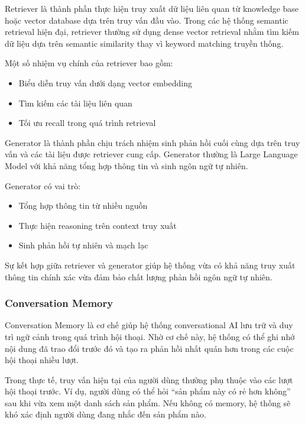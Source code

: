Retriever là thành phần thực hiện truy xuất dữ liệu liên quan từ knowledge base hoặc vector database dựa trên truy vấn đầu vào. Trong các hệ thống semantic retrieval hiện đại, retriever thường sử dụng dense vector retrieval nhằm tìm kiếm dữ liệu dựa trên semantic similarity thay vì keyword matching truyền thống.

Một số nhiệm vụ chính của retriever bao gồm:
\begin{itemize}
    \item Biểu diễn truy vấn dưới dạng vector embedding
    
    \item Tìm kiếm các tài liệu liên quan
    
    \item Tối ưu recall trong quá trình retrieval
\end{itemize}

Generator là thành phần chịu trách nhiệm sinh phản hồi cuối cùng dựa trên truy vấn và các tài liệu được retriever cung cấp. Generator thường là Large Language Model với khả năng tổng hợp thông tin và sinh ngôn ngữ tự nhiên.

Generator có vai trò:
\begin{itemize}
    \item Tổng hợp thông tin từ nhiều nguồn
    
    \item Thực hiện reasoning trên context truy xuất
    
    \item Sinh phản hồi tự nhiên và mạch lạc
\end{itemize}

Sự kết hợp giữa retriever và generator giúp hệ thống vừa có khả năng truy xuất thông tin chính xác vừa đảm bảo chất lượng phản hồi ngôn ngữ tự nhiên.

\subsubsection{Conversation Memory}

Conversation Memory là cơ chế giúp hệ thống conversational AI lưu trữ và duy trì ngữ cảnh trong quá trình hội thoại. Nhờ cơ chế này, hệ thống có thể ghi nhớ nội dung đã trao đổi trước đó và tạo ra phản hồi nhất quán hơn trong các cuộc hội thoại nhiều lượt.

Trong thực tế, truy vấn hiện tại của người dùng thường phụ thuộc vào các lượt hội thoại trước. Ví dụ, người dùng có thể hỏi ``sản phẩm này có rẻ hơn không'' sau khi vừa xem một danh sách sản phẩm. Nếu không có memory, hệ thống sẽ khó xác định người dùng đang nhắc đến sản phẩm nào.

